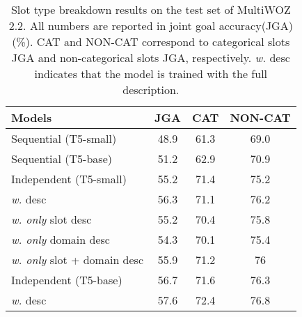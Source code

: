 \documentclass[11pt]{article}
\begin{document}
\begin{table}[t]
    \small
    \centering

    \begin{tabular}{lc@{\hskip3pt}c@{\hskip3pt}c}
    \toprule
        \textbf{Models}  &  \textbf{JGA} & \textbf{CAT} & \textbf{NON-CAT} \\
        \midrule
        Sequential (T5-small)  & 48.9 & 61.3 & 69.0  \\
        Sequential (T5-base) & 51.2 & 62.9 & 70.9  \\
        \midrule
        Independent (T5-small)  & 55.2 & 71.4 & 75.2  \\
        \quad \textit{w.} desc & 56.3 & 71.1 & 76.2  \\
        \quad \textit{w. only} slot desc & 55.2 & 70.4 & 75.8  \\
        \quad \textit{w. only} domain desc & 54.3 & 70.1 & 75.4  \\
        \quad \textit{w. only} slot + domain desc & 55.9 & 71.2 & 76  \\
        \midrule
        Independent (T5-base)  & 56.7 & 71.6 &  76.3 \\
        \quad \textit{w.} desc & 57.6 & 72.4 & 76.8 \\
        \bottomrule
    \end{tabular}
        \caption{Slot type breakdown results on the test set of MultiWOZ 2.2. All numbers are reported in joint goal accuracy(JGA) (\%). CAT and NON-CAT correspond to categorical slots JGA and non-categorical slots JGA, respectively. \textit{w.} desc indicates that the model is trained with the full description.}
    \label{tab:cat}
\end{table}
\end{document}
